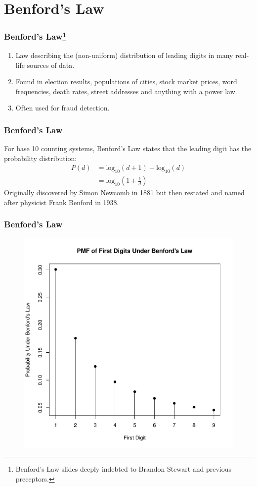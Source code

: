 \documentclass{beamer}
\begin{document}
\section{Benford's Law}
\begin{frame}\frametitle{Benford's Law\footnote{Benford's Law slides deeply indebted to Brandon Stewart and previous preceptors.}}
\begin{enumerate}
\item Law describing the (non-uniform) distribution of leading digits in many real-life sources of data.
\item Found in election results, populations of cities, stock market prices, word frequencies, death rates, street addresses and anything with a power law.
\item Often used for fraud detection.
\end{enumerate}
\end{frame}

\begin{frame}\frametitle{Benford's Law}
For base 10 counting systems, Benford's Law states that the leading digit has the probability distribution:
\begin{align*}
P(d) &= \text{log}_{10}(d + 1) - \text{log}_{10}(d) \\
&= \text{log}_{10}(1 + \frac{1}{d})
\end{align*}
Originally discovered by Simon Newcomb in 1881 but then restated and named after physicist Frank Benford in 1938.
\end{frame}

\begin{frame}\frametitle{Benford's Law}
\begin{figure}[h!]
\centering
\includegraphics[scale=.4]{figures/Section2PMF.pdf}
\end{figure}
\end{frame}
\end{document}
